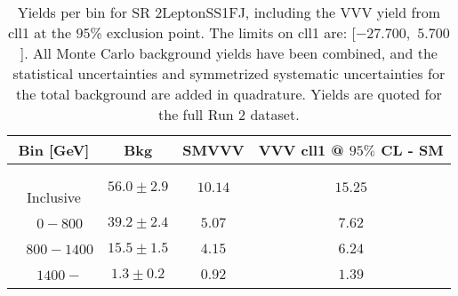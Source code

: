 \begin{table}[!htbp]
    \small
    \center
    \begin{tabular}{c||c|c|c}
    Bin [GeV] & Bkg & SMVVV & \pbox{20cm}{VVV \\ cll1 @ $95\%$ CL - SM \\ }\\
    \hline
    \pbox{20cm}{ ~ \\Inclusive\\ } & $56.0 \pm 2.9$ & $10.14$ & $15.25$\\
    \hline
    \pbox{20cm}{ ~ \\$0-800$\\ } & $39.2 \pm 2.4$ & $5.07$ & $7.62$\\
    \hline
    \pbox{20cm}{ ~ \\$800-1400$\\ } & $15.5 \pm 1.5$ & $4.15$ & $6.24$\\
    \hline
    \pbox{20cm}{ ~ \\$1400-$\\ } & $1.3 \pm 0.2$ & $0.92$ & $1.39$\\
\end{tabular}
    \caption{Yields per bin for SR 2LeptonSS1FJ, including the VVV yield from cll1 at the $95$\% exclusion point. The limits on cll1 are: [$-27.700$,~$5.700$]. All Monte Carlo background yields have been combined, and the statistical uncertainties and symmetrized systematic uncertainties for the total background are added in quadrature. Yields are quoted for the full Run 2 dataset.}
    \label{tab:2LeptonSS1FJ$binssignal}
\end{table}
